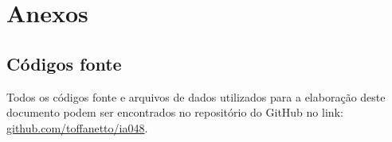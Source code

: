 \thispagestyle{plain}
\section*{Anexos}

\subsection*{Códigos fonte}

Todos os códigos fonte e arquivos de dados utilizados para a elaboração deste documento podem ser encontrados no repositório do GitHub no link: \href{https://github.com/toffanetto/ia048/tree/main/3-Neural_Network}{\color{blue}github.com/toffanetto/ia048}.


